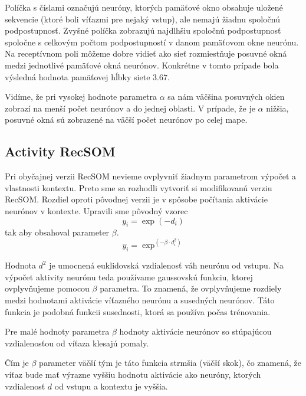 Políčka s číslami označujú neuróny, ktorých pamäťové okno obsahuje uložené sekvencie (ktoré boli víťazmi pre nejaký vstup), ale nemajú žiadnu 
spoločnú podpostupnosť.
Zvyšné políčka zobrazujú najdlhšiu spoločnú podpostupnosť spoločne s celkovým počtom podpostupností 
v danom pamäťovom okne neurónu. Na receptívnom poli môžeme dobre vidieť ako sieť rozmiestňuje posuvné okná medzi jednotlivé pamäťové okná neurónov.
Konkrétne v tomto prípade bola výsledná hodnota pamäťovej hĺbky siete $3.67$.

Vidíme, že pri vysokej hodnote parametra $\alpha$ sa nám väčšina posuvných okien zobrazí na menší počet neurónov a do jednej 
oblasti. V prípade, že je $\alpha$ nižšia, posuvné okná sú zobrazené na väčší počet neurónov po celej mape.

\subsection{Activity RecSOM}
Pri obyčajnej verzii RecSOM nevieme ovplyvniť žiadnym parametrom výpočet a vlastnosti kontextu. 
Preto sme sa rozhodli vytvoriť si modifikovanú verziu RecSOM. Rozdiel oproti pôvodnej verzii je v spôsobe počítania 
aktivácie neurónov v kontexte. 
Upravili sme pôvodný vzorec 
\begin{equation}
    y_{i} = \exp{(-d_{i})}
\end{equation}
tak aby obsahoval parameter $\beta$.
\begin{equation}
    y_{i} = \exp^{(-\beta \cdot d_{i}^2)}
\end{equation}

Hodnota $d^2$ je umocnená euklidovská vzdialenosť váh neurónu od vstupu.
Na výpočet aktivity neurónu teda používame gaussovskú funkciu, ktorej  ovplyvňujeme
pomocou $\beta$ parametra. To znamená, že ovplyvňujeme rozdiely medzi hodnotami aktivácie víťazného neurónu
a susedných neurónov. Táto funkcia je podobná funkcii susednosti, ktorá sa používa počas trénovania. 

Pre malé hodnoty parametra $\beta$ hodnoty aktivácie neurónov so stúpajúcou vzdialenosťou od víťaza
klesajú pomaly. 

Čím je $\beta$ parameter väčší tým je táto funkcia strmšia (väčší skok), čo znamená, že víťaz bude mať výrazne vyššiu hodnotu aktivácie
ako neuróny, ktorých vzdialenosť $d$ od vstupu a kontextu je vyššia.

